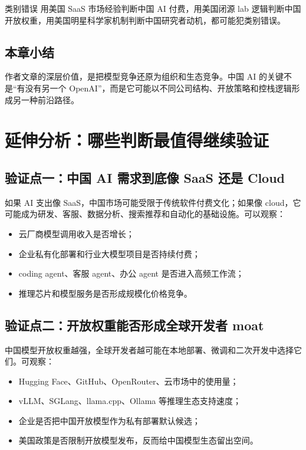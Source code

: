 \documentclass[a4paper]{article}
\begin{document}
\begin{warningbox}{类别错误}
用美国 SaaS 市场经验判断中国 AI 付费，用美国闭源 lab 逻辑判断中国开放权重，用美国明星科学家机制判断中国研究者动机，都可能犯类别错误。
\end{warningbox}

\subsection{本章小结}

作者文章的深层价值，是把模型竞争还原为组织和生态竞争。中国 AI 的关键不是``有没有另一个 OpenAI''，而是它可能以不同公司结构、开放策略和控栈逻辑形成另一种前沿路径。


\section{延伸分析：哪些判断最值得继续验证}

\subsection{验证点一：中国 AI 需求到底像 SaaS 还是 Cloud}

如果 AI 支出像 SaaS，中国市场可能受限于传统软件付费文化；如果像 cloud，它可能成为研发、客服、数据分析、搜索推荐和自动化的基础设施。可以观察：

\begin{itemize}[leftmargin=1.5em]
    \item 云厂商模型调用收入是否增长；
    \item 企业私有化部署和行业大模型项目是否持续付费；
    \item coding agent、客服 agent、办公 agent 是否进入高频工作流；
    \item 推理芯片和模型服务是否形成规模化价格竞争。
\end{itemize}

\subsection{验证点二：开放权重能否形成全球开发者 moat}

中国模型开放权重越强，全球开发者越可能在本地部署、微调和二次开发中选择它们。可观察：

\begin{itemize}[leftmargin=1.5em]
    \item Hugging Face、GitHub、OpenRouter、云市场中的使用量；
    \item vLLM、SGLang、llama.cpp、Ollama 等推理生态支持速度；
    \item 企业是否把中国开放模型作为私有部署默认候选；
    \item 美国政策是否限制开放模型发布，反而给中国模型生态留出空间。
\end{itemize}
\end{document}
